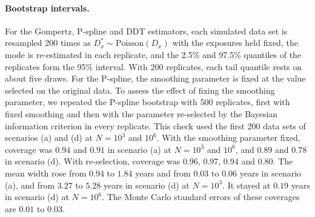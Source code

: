 \documentclass[12pt, letterpaper]{article}
\begin{document}
\paragraph{Bootstrap intervals.} For the Gompertz, P-spline and DDT estimators, each simulated data set is resampled 200 times as $D_x^\ast \sim \text{Poisson}(D_x)$ with the exposures held fixed, the mode is re-estimated in each replicate, and the 2.5\% and 97.5\% quantiles of the replicates form the 95\% interval. With 200 replicates, each tail quantile rests on about five draws. For the P-spline, the smoothing parameter is fixed at the value selected on the original data. To assess the effect of fixing the smoothing parameter, we repeated the P-spline bootstrap with 500 replicates, first with fixed smoothing and then with the parameter re-selected by the Bayesian information criterion in every replicate. This check used the first 200 data sets of scenarios (a) and (d) at $N = 10^3$ and $10^6$. With the smoothing parameter fixed, coverage was $0.94$ and $0.91$ in scenario (a) at $N = 10^3$ and $10^6$, and $0.89$ and $0.78$ in scenario (d). With re-selection, coverage was $0.96$, $0.97$, $0.94$ and $0.80$. The mean width rose from $0.94$ to $1.84$ years and from $0.03$ to $0.06$ years in scenario (a), and from $3.27$ to $5.28$ years in scenario (d) at $N = 10^3$. It stayed at $0.19$ years in scenario (d) at $N = 10^6$. The Monte Carlo standard errors of these coverages are $0.01$ to $0.03$.


\end{document}
